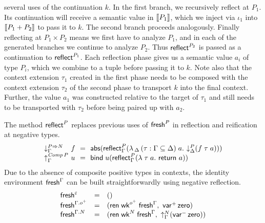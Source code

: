 \documentclass[sigplan,screen,fleqn,review]{acmart} %
\begin{document}
several uses of the continuation $k$.
In the first branch, we recursively reflect at $P_1$.  Its
continuation will receive a semantic value in $\mathopen{{[\kern-0.14em[}} P_1 \mathclose{{]\kern-0.14em]}}$, which we
inject via $\iota_1$ into $\mathopen{{[\kern-0.14em[}} P_1 + P_2 \mathclose{{]\kern-0.14em]}}$ to pass it to $k$.  The
second branch proceeds analogously.
Finally reflecting at $P_1 \times P_2$ means we first have to analyze
$P_1$, and in each of the generated branches we continue to analyze
$P_2$.  Thus $\mathsf{reflect}_{}^{P_2}$ is passed as a continuation to
$\mathsf{reflect}_{}^{P_1}$.  Each reflection phase gives us a semantic value
$a_i$ of type $P_i$, which we combine to a tuple before passing it to
$k$.  Note also that the context extension $\tau_1$ created in the
first phase needs to be composed with the context extension $\tau_2$
of the second phase to transport $k$ into the final context.  Further,
the value $a_1$ was constructed relative to the target of
$\tau_1$ and still needs
to be transported with $\tau_2$ before being paired up with $a_2$.

The method $\mathsf{reflect}_{}^{P}$ replaces previous uses of $\mathsf{fresh}^P$ in
reflection and reification at negative types.
\[
\begin{array}{l@{~}l@{~~}c@{~~}l}
  \downG {P \To N} & f & = & \tabs
    \left(
      \reflect[\Gamma] P
        \left(
          \lambda \, _\Delta \, (\tau : \Gamma \sublist \Delta) \; a .\
          \down[\Delta] P (f \; \tau \; a)
        \right)
    \right)
  \\
  \upG {\Comp P} & u & = & \tbind \; u
    \left(
      \reflect[\Gamma] P
        \left(
          \lambda \; \tau \; a .\
          \treturn\; a
        \right)
    \right)
\end{array}
\]
Due to the absence of composite positive types in contexts,
the identity environment $\mathsf{fresh}^{\Gamma}$ can be built
straightforwardly using negative reflection.
\[
\begin{array}{lcl}
  \mathsf{fresh}^{\varepsilon} & = & () \\
  \mathsf{fresh}^{\Gamma.o^+} & = &
    (
      \mathsf{ren}\;\mathsf{wk}^{o^+}\;\mathsf{fresh}^{\Gamma}
      , \
      \mathsf{var}^{+}\,\mathsf{zero}
    ) \\
  \mathsf{fresh}^{\Gamma.N} & = &
    (
      \mathsf{ren}\;\mathsf{wk}^N\;\mathsf{fresh}^{\Gamma}
      , \
      \mathord{\uparrow_{\Gamma}^{N}} (\mathsf{var}^{-}\,\mathsf{zero})
    ) \\
\end{array}
\]
\end{document}

